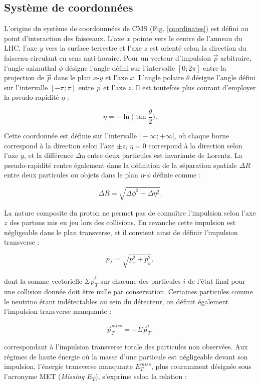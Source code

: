\subsection{Système de coordonnées}

L'origine du système de coordonnnées de CMS (Fig. \ref{coordinates}) est défini au point d'interaction des faisceaux. L'axe $x$ pointe vers le centre de l'anneau du LHC, l'axe $y$ vers la surface terrestre et l'axe $z$ est orienté selon la direction du faisceau circulant en sens anti-horaire. Pour un vecteur d'impulsion $\vec{p}$ arbitraire, l'angle azimuthal $\phi$ désigne l'angle défini sur l'intervalle $[0;2\pi]$ entre la projection de $\vec{p}$ dans le plan $x$-$y$ et l'axe $x$. L'angle polaire $\theta$ désigne l'angle défini sur l'intervalle $[-\pi;\pi]$ entre $\vec{p}$ et l'axe $z$. Il est toutefois plus courant d'employer la pseudo-rapidité $\eta$ :

$$\eta = -\ln\bigl(\tan\frac{\theta}{2}\bigr).$$

Cette coordonnée est définie sur l'intervalle $]-\infty;+\infty[$, où chaque borne correspond à la direction selon l'axe $\pm z$, $\eta=0$ correspond à la direction selon l'axe $y$, et la différence $\Delta \eta$ entre deux particules est invariante de Lorentz. La pseudo-rapidité rentre également dans la définition de la séparation spatiale $\Delta R$ entre deux particules ou objets dans le plan $\eta$-$\phi$ définie comme :

$$\Delta R = \sqrt{\Delta\phi^2+\Delta\eta^2}.$$

La nature composite du proton ne permet pas de connaître l'impulsion selon l'axe $z$ des partons mis en jeu lors des collisions. En revanche cette impulsion est négligeable dans le plan transverse, et il convient ainsi de définir l'impulsion transverse : 

$$p_T=\sqrt{p_x^2+p_y^2},$$

dont la somme vectorielle $\Sigma\vec{p}_T^i$ sur chacune des particules $i$ de l'état final pour une collision donnée doit être nulle par conservation. Certaines particules comme le neutrino étant indétectables au sein du détecteur, on définit également l'impulsion transverse manquante :

$$\vec{p}^{miss}_T=-\Sigma\vec{p}_T^i,$$

correspondant à l'impulsion transverse totale des particules non observées. Aux régimes de haute énergie où la masse d'une particule est négligeable devant son impulsion, l'énergie transverse manquante $E^{miss}_T$, plus couramment désignée sous l'acronyme MET (\textit{Missing $E_T$}), s'exprime selon la relation :

